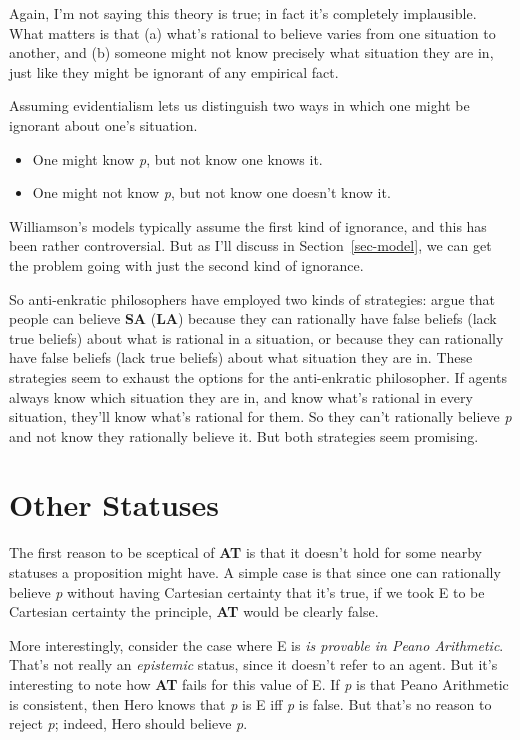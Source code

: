 \documentclass[
  11pt,
  letterpaper,
  DIV=11,
  numbers=noendperiod,
  twoside]{scrartcl}
\providecommand{\tightlist}{%
  \setlength{\itemsep}{0pt}\setlength{\parskip}{0pt}}
\begin{document}
Again, I'm not saying this theory is true; in fact it's completely
implausible. What matters is that (a) what's rational to believe varies
from one situation to another, and (b) someone might not know precisely
what situation they are in, just like they might be ignorant of any
empirical fact.

Assuming evidentialism lets us distinguish two ways in which one might
be ignorant about one's situation.

\begin{itemize}
\tightlist
\item
  One might know \emph{p}, but not know one knows it.
\item
  One might not know \emph{p}, but not know one doesn't know it.
\end{itemize}

Williamson's models typically assume the first kind of ignorance, and
this has been rather controversial. But as I'll discuss in
Section~\ref{sec-model}, we can get the problem going with just the
second kind of ignorance.

So anti-enkratic philosophers have employed two kinds of strategies:
argue that people can believe \textbf{SA} (\textbf{LA}) because they can
rationally have false beliefs (lack true beliefs) about what is rational
in a situation, or because they can rationally have false beliefs (lack
true beliefs) about what situation they are in. These strategies seem to
exhaust the options for the anti-enkratic philosopher. If agents always
know which situation they are in, and know what's rational in every
situation, they'll know what's rational for them. So they can't
rationally believe \emph{p} and not know they rationally believe it. But
both strategies seem promising.

\section{Other Statuses}\label{sec-status}

The first reason to be sceptical of \textbf{AT} is that it doesn't hold
for some nearby statuses a proposition might have. A simple case is that
since one can rationally believe \emph{p} without having Cartesian
certainty that it's true, if we took E to be Cartesian certainty the
principle, \textbf{AT} would be clearly false.

More interestingly, consider the case where E is \emph{is provable in
Peano Arithmetic}. That's not really an \emph{epistemic} status, since
it doesn't refer to an agent. But it's interesting to note how
\textbf{AT} fails for this value of E. If \emph{p} is that Peano
Arithmetic is consistent, then Hero knows that \emph{p} is E iff
\emph{p} is false. But that's no reason to reject \emph{p}; indeed, Hero
should believe \emph{p}.
\end{document}
